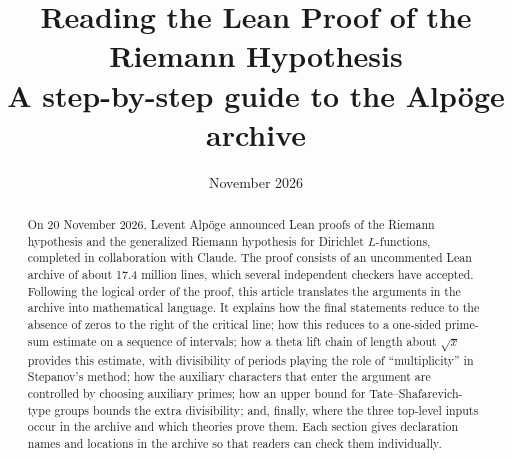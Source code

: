 \documentclass[11pt]{article}
\title{\textsf{Reading the Lean Proof of the Riemann Hypothesis}\\[4pt]\large A step-by-step guide to the Alpöge archive}
\date{November 2026}
\author{}
\begin{document}
\maketitle

\begin{abstract}
On 20 November 2026, Levent Alpöge announced Lean proofs of the Riemann hypothesis and the generalized Riemann hypothesis for Dirichlet $L$-functions, completed in collaboration with Claude. The proof consists of an uncommented Lean archive of about 17.4 million lines, which several independent checkers have accepted. Following the logical order of the proof, this article translates the arguments in the archive into mathematical language. It explains how the final statements reduce to the absence of zeros to the right of the critical line; how this reduces to a one-sided prime-sum estimate on a sequence of intervals; how a theta lift chain of length about $\sqrt x$ provides this estimate, with divisibility of periods playing the role of ``multiplicity'' in Stepanov's method; how the auxiliary characters that enter the argument are controlled by choosing auxiliary primes; how an upper bound for Tate--Shafarevich-type groups bounds the extra divisibility; and, finally, where the three top-level inputs occur in the archive and which theories prove them. Each section gives declaration names and locations in the archive so that readers can check them individually.
\end{abstract}
\end{document}
